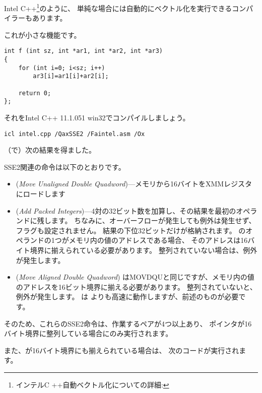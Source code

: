 Intel C++\footnote{インテルC ++自動ベクトル化についての詳細: \URLINTELVEC}のように、
単純な場合には自動的にベクトル化を実行できるコンパイラーもあります。

これが小さな機能です。

\begin{lstlisting}[style=customc]
int f (int sz, int *ar1, int *ar2, int *ar3)
{
	for (int i=0; i<sz; i++)
		ar3[i]=ar1[i]+ar2[i];

	return 0;
};
\end{lstlisting}


それをIntel C++ 11.1.051 win32でコンパイルしましょう。

\begin{verbatim}
icl intel.cpp /QaxSSE2 /Faintel.asm /Ox
\end{verbatim}

（\IDA で）次の結果を得ました。



SSE2関連の命令は以下のとおりです。
\begin{itemize}
\item
\MOVDQU (\emph{Move Unaligned Double Quadword})---メモリから16バイトをXMMレジスタにロードします

\item
\PADDD (\emph{Add Packed Integers})---4対の32ビット数を加算し、その結果を最初のオペランドに残します。
ちなみに、オーバーフローが発生しても例外は発生せず、フラグも設定されません。
結果の下位32ビットだけが格納されます。 
\PADDD のオペランドの1つがメモリ内の値のアドレスである場合、
そのアドレスは16バイト境界に揃えられている必要があります。
整列されていない場合は、例外が発生します。

\item
\MOVDQA (\emph{Move Aligned Double Quadword})
はMOVDQUと同じですが、メモリ内の値のアドレスを16ビット境界に揃える必要があります。
整列されていないと、例外が発生します。 
\MOVDQA は \MOVDQU よりも高速に動作しますが、前述のものが必要です。

\end{itemize}

そのため、これらのSSE2命令は、作業するペアが4つ以上あり、
ポインタが16バイト境界に整列している場合にのみ実行されます。

また、が16バイト境界にも揃えられている場合は、
次のコードが実行されます。

